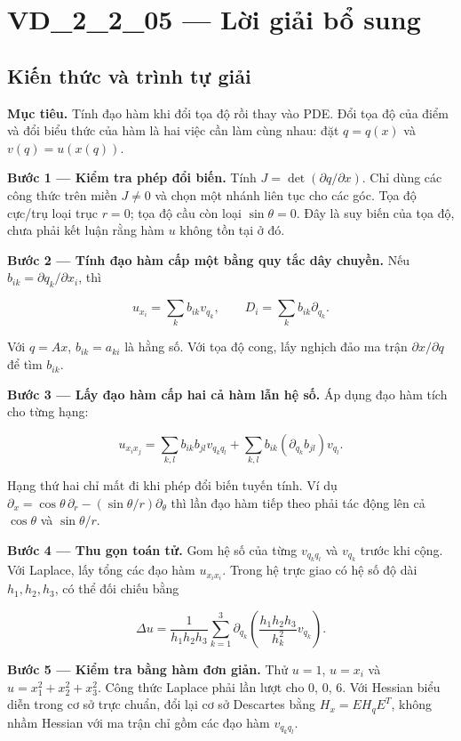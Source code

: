\documentclass[10pt,a4paper]{article}
\begin{document}
\section*{VD\_2\_2\_05 — Lời giải bổ sung}
\subsection*{Kiến thức và trình tự giải}
\textbf{Mục tiêu.} Tính đạo hàm khi đổi tọa độ rồi thay vào PDE. Đổi tọa độ của điểm và đổi biểu thức của hàm là hai việc cần làm cùng nhau: đặt $q=q(x)$ và $v(q)=u(x(q))$.

\textbf{Bước 1 — Kiểm tra phép đổi biến.} Tính $J=\det(\partial q/\partial x)$. Chỉ dùng các công thức trên miền $J\ne0$ và chọn một nhánh liên tục cho các góc. Tọa độ cực/trụ loại trục $r=0$; tọa độ cầu còn loại $\sin\theta=0$. Đây là suy biến của tọa độ, chưa phải kết luận rằng hàm $u$ không tồn tại ở đó.

\textbf{Bước 2 — Tính đạo hàm cấp một bằng quy tắc dây chuyền.} Nếu $b_{ik}=\partial q_k/\partial x_i$, thì


\[
u_{x_i}=\sum_k b_{ik}v_{q_k},\qquad D_i=\sum_k b_{ik}\partial_{q_k}.
\]


Với $q=Ax$, $b_{ik}=a_{ki}$ là hằng số. Với tọa độ cong, lấy nghịch đảo ma trận $\partial x/\partial q$ để tìm $b_{ik}$.

\textbf{Bước 3 — Lấy đạo hàm cấp hai cả hàm lẫn hệ số.} Áp dụng đạo hàm tích cho từng hạng:


\[
u_{x_ix_j}=\sum_{k,l}b_{ik}b_{jl}v_{q_kq_l}
+\sum_{k,l}b_{ik}(\partial_{q_k}b_{jl})v_{q_l}.
\]


Hạng thứ hai chỉ mất đi khi phép đổi biến tuyến tính. Ví dụ $\partial_x=\cos\theta\,\partial_r-(\sin\theta/r)\partial_\theta$ thì lần đạo hàm tiếp theo phải tác động lên cả $\cos\theta$ và $\sin\theta/r$.

\textbf{Bước 4 — Thu gọn toán tử.} Gom hệ số của từng $v_{q_kq_l}$ và $v_{q_k}$ trước khi cộng. Với Laplace, lấy tổng các đạo hàm $u_{x_ix_i}$. Trong hệ trực giao có hệ số độ dài $h_1,h_2,h_3$, có thể đối chiếu bằng


\[
\Delta u=\frac1{h_1h_2h_3}\sum_{k=1}^3
\partial_{q_k}\left(\frac{h_1h_2h_3}{h_k^2}v_{q_k}\right).
\]


\textbf{Bước 5 — Kiểm tra bằng hàm đơn giản.} Thử $u=1$, $u=x_i$ và $u=x_1^2+x_2^2+x_3^2$. Công thức Laplace phải lần lượt cho $0$, $0$, $6$. Với Hessian biểu diễn trong cơ sở trực chuẩn, đổi lại cơ sở Descartes bằng $H_x=E H_q E^T$, không nhầm Hessian với ma trận chỉ gồm các đạo hàm $v_{q_kq_l}$.
\end{document}
